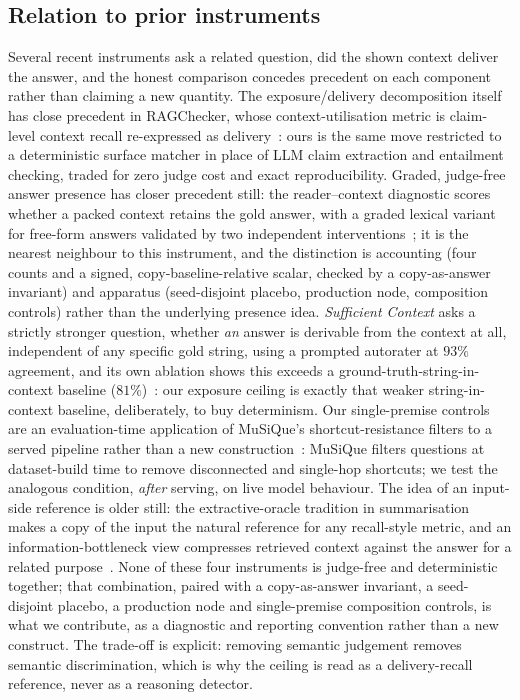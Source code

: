 \documentclass[10pt,twocolumn]{article}
\begin{document}
\subsection{Relation to prior instruments}\label{sec:ceiling-prior}
Several recent instruments ask a related question, did the shown context deliver the answer, and the honest comparison concedes precedent on each component rather than claiming a new quantity. The exposure/delivery decomposition itself has close precedent in RAGChecker, whose context-utilisation metric is claim-level context recall re-expressed as delivery~\cite{ragchecker2024}: ours is the same move restricted to a deterministic surface matcher in place of LLM claim extraction and entailment checking, traded for zero judge cost and exact reproducibility. Graded, judge-free answer presence has closer precedent still: the reader--context diagnostic scores whether a packed context retains the gold answer, with a graded lexical variant for free-form answers validated by two independent interventions~\cite{readercontext2026}; it is the nearest neighbour to this instrument, and the distinction is accounting (four counts and a signed, copy-baseline-relative scalar, checked by a copy-as-answer invariant) and apparatus (seed-disjoint placebo, production node, composition controls) rather than the underlying presence idea. \emph{Sufficient Context} asks a strictly stronger question, whether \emph{an} answer is derivable from the context at all, independent of any specific gold string, using a prompted autorater at $93\%$ agreement, and its own ablation shows this exceeds a ground-truth-string-in-context baseline ($81\%$)~\cite{sufficientcontext2025}: our exposure ceiling is exactly that weaker string-in-context baseline, deliberately, to buy determinism. Our single-premise controls are an evaluation-time application of MuSiQue's shortcut-resistance filters to a served pipeline rather than a new construction~\cite{musique2022}: MuSiQue filters questions at dataset-build time to remove disconnected and single-hop shortcuts; we test the analogous condition, \emph{after} serving, on live model behaviour. The idea of an input-side reference is older still: the extractive-oracle tradition in summarisation~\cite{see2017pointergenerator,narayan2018xsum,xu2019extractive} makes a copy of the input the natural reference for any recall-style metric, and an information-bottleneck view compresses retrieved context against the answer for a related purpose~\cite{zhu2024ibrag}. None of these four instruments is judge-free and deterministic together; that combination, paired with a copy-as-answer invariant, a seed-disjoint placebo, a production node and single-premise composition controls, is what we contribute, as a diagnostic and reporting convention rather than a new construct. The trade-off is explicit: removing semantic judgement removes semantic discrimination, which is why the ceiling is read as a delivery-recall reference, never as a reasoning detector.
\end{document}

